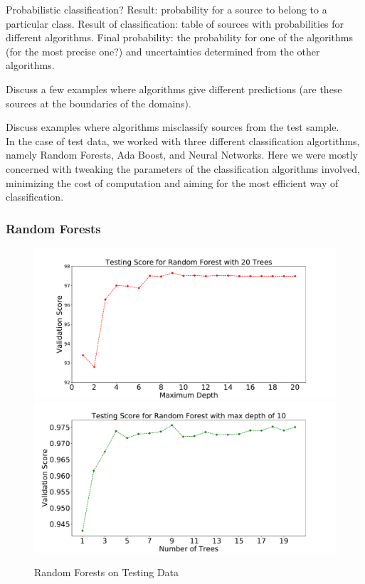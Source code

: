 Probabilistic classification? Result: probability for a source to belong to a particular class.
Result of classification: table of sources with probabilities for different algorithms.
Final probability: the probability for one of the algorithms (for the most precise one?) and uncertainties determined from the other algorithms.

Discuss a few examples where algorithms give different predictions (are these sources at the boundaries of the domains).

Discuss examples where algorithms misclassify sources from the test sample.\\


In the case of test data, we worked with three different classification algortithms, namely Random Forests, Ada Boost, and Neural Networks. Here we were mostly concerned with tweaking the parameters of the classification algorithms involved, minimizing the cost of computation and aiming for the most efficient way of classification. \\

\subsubsection{Random Forests}


\begin{figure}[h]
\includegraphics[width=\twopicsp\textwidth]{plots/depthvsscore_rf_10seeds_20trees.pdf} \\
\includegraphics[width=\twopicsp\textwidth]{plots/treesvsscore_RF_10seeds_10maxdepth}
\caption{
Random Forests on Testing Data
}
\label{fig:Maps_data}
\end{figure}

